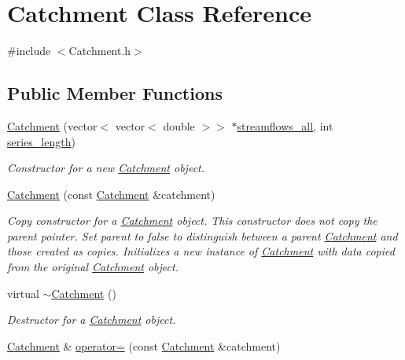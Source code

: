\hypertarget{classCatchment}{}\section{Catchment Class Reference}
\label{classCatchment}


{\ttfamily \#include $<$Catchment.\+h$>$}

\subsection*{Public Member Functions}
\begin{DoxyCompactItemize}
\item 
\mbox{\hyperlink{classCatchment_aafdee6ee868a8892314672abb119e60f}{Catchment}} (vector$<$ vector$<$ double $>$$>$ $\ast$\mbox{\hyperlink{classCatchment_a579ccda86831f286c19c76354e7125c3}{streamflows\+\_\+all}}, int \mbox{\hyperlink{classCatchment_a2d4994220f63b876348b4ce4892bc6d3}{series\+\_\+length}})
\begin{DoxyCompactList}\small\item\em Constructor for a new \mbox{\hyperlink{classCatchment}{Catchment}} object. \end{DoxyCompactList}\item 
\mbox{\hyperlink{classCatchment_ae311c4b2d857a8b5abc01f5317b04df2}{Catchment}} (const \mbox{\hyperlink{classCatchment}{Catchment}} \&catchment)
\begin{DoxyCompactList}\small\item\em Copy constructor for a \mbox{\hyperlink{classCatchment}{Catchment}} object. This constructor does not copy the parent pointer. Set parent to false to distinguish between a parent \mbox{\hyperlink{classCatchment}{Catchment}} and those created as copies. Initializes a new instance of \mbox{\hyperlink{classCatchment}{Catchment}} with data copied from the original \mbox{\hyperlink{classCatchment}{Catchment}} object. \end{DoxyCompactList}\item 
virtual \mbox{\hyperlink{classCatchment_ad12bc6d64d4bd5133ac1086a52e240b3}{$\sim$\+Catchment}} ()
\begin{DoxyCompactList}\small\item\em Destructor for a \mbox{\hyperlink{classCatchment}{Catchment}} object. \end{DoxyCompactList}\item 
\mbox{\hyperlink{classCatchment}{Catchment}} \& \mbox{\hyperlink{classCatchment_a5abab52eab9c05164f76e46954833989}{operator=}} (const \mbox{\hyperlink{classCatchment}{Catchment}} \&catchment)
$$
\end{DoxyCompactItemize}
